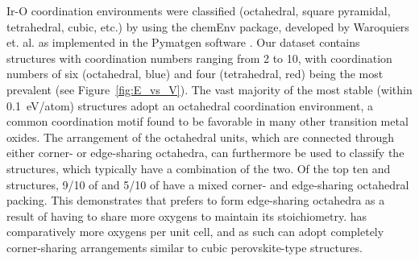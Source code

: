 %
Ir-O coordination environments were classified
(octahedral, square pyramidal, tetrahedral, cubic, etc.)
by using the chemEnv package, developed by Waroquiers et. al. \cite{Waroquiers2017} as implemented in the Pymatgen software \cite{Ong2013}.
%
Our dataset contains structures with coordination numbers ranging from 2 to 10,
with coordination numbers of six (octahedral, blue) and four (tetrahedral, red) being the most prevalent (see Figure~\ref{fig:E_vs_V}).
%
The vast majority of the most stable (within \SI{0.1}{\electronvolt}/atom) structures adopt an octahedral coordination environment,
a common coordination motif found to be favorable in many other transition metal oxides.\cite{Waroquiers2017}
%
The arrangement of the octahedral units, which are connected through either corner- or edge-sharing octahedra,
can furthermore be used to classify the structures,
which typically have a combination of the two.
%
Of the top ten \IrOtwo and \IrOthree structures, \num{9/10} of \IrOtwo and \num{5/10} of \IrOthree have a mixed corner- and edge-sharing octahedral packing.
%
This demonstrates that \IrOtwo prefers to form edge-sharing octahedra as a result of having to share more oxygens to maintain its stoichiometry.
%
\IrOthree has comparatively more oxygens per unit cell, and as such can adopt completely corner-sharing arrangements similar to cubic perovskite-type structures.


